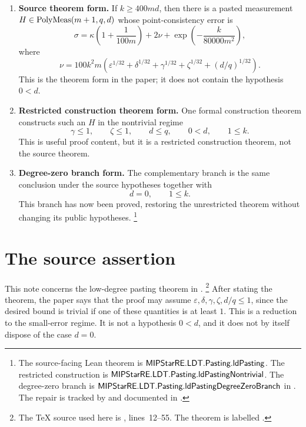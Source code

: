 \documentclass{article}
\begin{document}
\begin{enumerate}
  \item \textbf{Source theorem form.}  If \(k\ge 400md\), then there is a
  pasted measurement \(H\in\mathrm{PolyMeas}(m+1, q, d)\) whose point-consistency error
  is
  \[
    \sigma=\kappa\left(1+\frac{1}{100m}\right)+2\nu+
    \exp\left(-\frac{k}{80000m^2}\right),
  \]
  where
  \[
    \nu=100k^2m\left(\varepsilon^{1/32}+\delta^{1/32}
      +\gamma^{1/32}+\zeta^{1/32}+(d/q)^{1/32}\right).
  \]
  This is the theorem form in the paper; it does not contain the hypothesis
  \(0<d\).

  \item \textbf{Restricted construction theorem form.}  One formal construction
  theorem constructs such an \(H\) in the nontrivial regime
  \[
    \gamma\le 1,\qquad \zeta\le 1,\qquad d\le q,\qquad 0<d,\qquad 1\le k.
  \]
  This is useful proof content, but it is a restricted construction theorem,
  not the source theorem.

  \item \textbf{Degree-zero branch form.}  The complementary branch is the same
  conclusion under the source hypotheses together with
  \[
    d=0,\qquad 1\le k.
  \]
  This branch has now been proved, restoring the unrestricted theorem without
  changing its public hypotheses.%
  \footnote{The source-facing Lean theorem is
  \(\textsf{MIPStarRE.LDT.Pasting.ldPasting}\).  The restricted construction is
  \(\textsf{MIPStarRE.LDT.Pasting.ldPastingNontrivial}\).  The degree-zero
  branch is \(\textsf{MIPStarRE.LDT.Pasting.ldPastingDegreeZeroBranch}\) in
  .  The repair is tracked
  by  and documented in .}
\end{enumerate}

\section{The source assertion}

This note concerns the low-degree pasting theorem in
\cite{Ji2020LowIndividualDegree}.%
\footnote{The TeX source used here is
, lines~12--55.  The theorem is
labelled .}
After stating the theorem, the paper says that the proof may assume
\(\varepsilon,\delta,\gamma,\zeta,d/q\le 1\), since the desired bound is
trivial if one of these quantities is at least \(1\).  This is a reduction to
the small-error regime.  It is not a hypothesis \(0<d\), and it does not by
itself dispose of the case \(d=0\).
\end{document}
